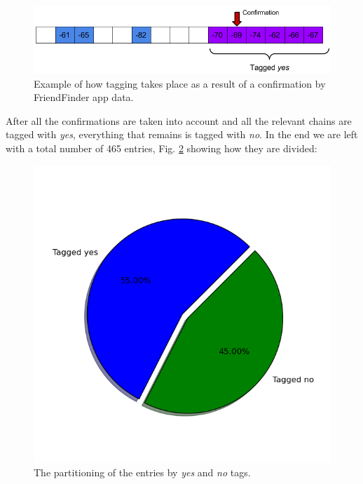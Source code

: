 \begin{figure}[h]
	\begin{center}
		\includegraphics[scale=0.6]{figures/taggedyes.png}
	\end{center}
	
	\caption{Example of how tagging takes place as a result of a confirmation by FriendFinder app data.}
	\label{pic:tag_yes}

\end{figure}

After all the confirmations are taken into account and all the relevant chains are tagged with \textit{yes}, everything that remains is tagged with \textit{no}.  In the end we are left with a total number of 465 entries, Fig. \ref{pic:division} showing how they are divided:

\begin{figure}[h]
	\begin{center}
		\includegraphics[scale=0.5]{figures/division.png}
	\end{center}
	
	\caption{The partitioning of the entries by \textit{yes} and \textit{no} tags.}
	\label{pic:division}

\end{figure}